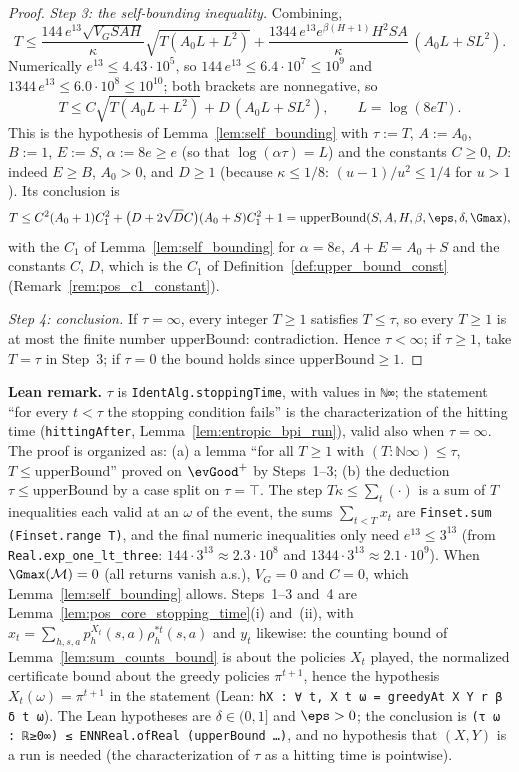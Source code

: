 \begin{proof}
\emph{Step 3: the self-bounding inequality.} Combining,
\[
  T \le \frac{144\,e^{13}\sqrt{V_G SAH}}{\kappa}\sqrt{T(A_0L + L^2)}
     + \frac{1344\,e^{13}e^{\beta(H+1)}H^2SA}{\kappa}\,(A_0L + SL^2) .
\]
Numerically $e^{13} \le 4.43\cdot 10^5$, so $144\,e^{13} \le 6.4\cdot 10^7 \le 10^9$ and
$1344\,e^{13} \le 6.0\cdot 10^8 \le 10^{10}$; both brackets are nonnegative, so
\[
  T \le C\sqrt{T(A_0L + L^2)} + D\,(A_0L + SL^2), \qquad L = \log(8eT) .
\]
This is the hypothesis of Lemma~\ref{lem:self_bounding} with $\tau := T$, $A := A_0$, $B := 1$,
$E := S$, $\alpha := 8e \ge e$ (so that $\log(\alpha\tau) = L$) and the constants $C \ge 0$, $D$: indeed
$E \ge B$, $A_0 > 0$, and $D \ge 1$ (because $\kappa \le 1/8$: $(u - 1)/u^2 \le 1/4$ for $u > 1$).
Its conclusion is
\[
  T \le C^2(A_0 + 1)C_1^2 + \big(D + 2\sqrt{D}C\big)(A_0 + S)C_1^2 + 1 = \mathrm{upperBound}(S,A,H,\beta,\eps,\delta,\Gmax),
\]
with the $C_1$ of Lemma~\ref{lem:self_bounding} for $\alpha = 8e$, $A + E = A_0 + S$ and the constants
$C$, $D$, which is the $C_1$ of Definition~\ref{def:upper_bound_const} (Remark~\ref{rem:pos_c1_constant}).

\emph{Step 4: conclusion.} If $\tau = \infty$, every integer $T \ge 1$ satisfies $T \le \tau$, so every
$T \ge 1$ is at most the finite number $\mathrm{upperBound}$: contradiction. Hence $\tau < \infty$; if
$\tau \ge 1$, take $T = \tau$ in Step~3; if $\tau = 0$ the bound holds since $\mathrm{upperBound} \ge 1$.
\end{proof}

\textbf{Lean remark.} $\tau$ is \texttt{IdentAlg.stoppingTime}, with values in \texttt{ℕ∞}; the
statement ``for every $t < \tau$ the stopping condition fails'' is the characterization of the
hitting time (\texttt{hittingAfter}, Lemma~\ref{lem:entropic_bpi_run}), valid also when $\tau = \infty$.
The proof is organized as: (a) a lemma ``for all $T \ge 1$ with $(T : \texttt{ℕ∞}) \le \tau$,
$T \le \mathrm{upperBound}$'' proved on $\evGood^+$ by Steps~1--3; (b) the deduction $\tau \le \mathrm{upperBound}$
by a case split on $\tau = \top$. The step $T\kappa \le \sum_t(\cdot)$ is a sum of $T$ inequalities each
valid at an $\omega$ of the event, the sums $\sum_{t<T}x_t$ are \texttt{Finset.sum (Finset.range T)},
and the final numeric inequalities only need $e^{13} \le 3^{13}$ (from \texttt{Real.exp\_one\_lt\_three}:
$144 \cdot 3^{13} \approx 2.3\cdot 10^8$ and $1344 \cdot 3^{13} \approx 2.1\cdot 10^9$). When
$\Gmax(\mathcal M) = 0$ (all returns vanish a.s.), $V_G = 0$ and $C = 0$, which Lemma~\ref{lem:self_bounding}
allows. Steps~1--3 and~4 are Lemma~\ref{lem:pos_core_stopping_time}(i) and~(ii), with
$x_t = \sum_{h,s,a}p^{X_t}_h(s,a)\rho^{*t}_h(s,a)$ and $y_t$ likewise: the counting bound of
Lemma~\ref{lem:sum_counts_bound} is about the policies $X_t$ played, the normalized certificate bound about
the greedy policies $\pi^{t+1}$, hence the hypothesis $X_t(\omega) = \pi^{t+1}$ in the statement (Lean:
\texttt{hX : ∀ t, X t ω = greedyAt X Y r β δ t ω}). The Lean hypotheses are $\delta \in (0, 1]$ and
$\eps > 0$; the conclusion is \texttt{(τ ω : ℝ≥0∞) ≤ ENNReal.ofReal (upperBound …)}, and no hypothesis that
$(X, Y)$ is a run is needed (the characterization of $\tau$ as a hitting time is pointwise).

